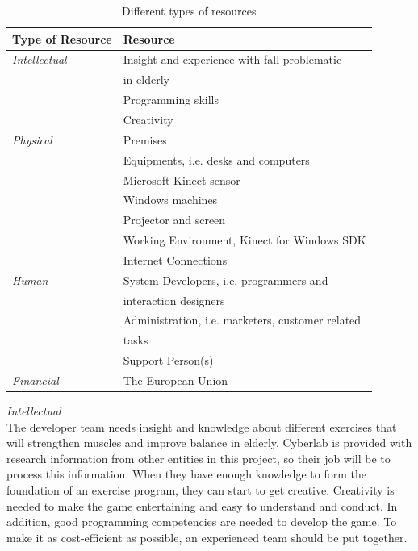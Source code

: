\begin{table}
\centering
    \begin{tabular}{|l|l|}
        \hline
       \textbf{Type of Resource} & \textbf{Resource}  \\ \hline
       \emph{Intellectual} & Insight and experience with fall problematic \\ & in elderly \\ \cline{2-2}
        & Programming skills \\ \cline{2-2}
	 	& Creativity \\ \hline
	   \emph{Physical} & Premises \\ \cline{2-2}
	   	& Equipments, i.e. desks and computers  \\ \cline{2-2}
	   	& Microsoft Kinect sensor \\ \cline{2-2}
	   	& Windows machines \\ \cline{2-2}
	   	& Projector and screen \\ \cline{2-2}
	   	& Working Environment, Kinect for Windows SDK \\ \cline{2-2}
	   	& Internet Connections \\ \hline
	   \emph{Human} & System Developers, i.e. programmers and \\ & interaction designers \\ \cline{2-2}
	   	& Administration, i.e. marketers, customer related \\ &tasks \\ \cline{2-2}
	   	& Support Person(s) \\ \hline
	   \emph{Financial} & The European Union \\
        \hline
    \end{tabular}
    \caption[Resources]{Different types of resources}
    \label{tab:Resources}
\end{table} 
\emph{Intellectual} \\ The developer team needs insight and knowledge about different exercises that will strengthen muscles and improve balance in elderly. Cyberlab is provided with research information from other entities in this project, so their job will be to process this information. When they have enough knowledge to form the foundation of an exercise program, they can start to get creative. Creativity is needed to make the game entertaining and easy to understand and conduct. In addition, good programming competencies are needed to develop the game. To make it as cost-efficient as possible, an experienced team should be put together. \\ \\
